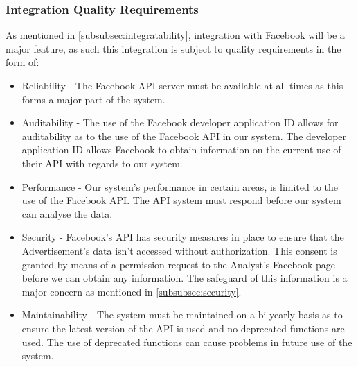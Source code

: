 \documentclass{article}
\begin{document}
		\subsubsection{Integration Quality Requirements}
		As mentioned in \ref{subsubsec:integratability}, integration with Facebook will be a major feature, as such this integration is subject to quality requirements in the form of:
		\begin{itemize}
			\item Reliability - The Facebook API server must be available at all times as this forms a major part of the system.
			\item Auditability - The use of the Facebook developer application ID allows for auditability as to the use of the Facebook API in our system. The developer application ID allows Facebook to obtain information on the current use of their API with regards to our system.
			\item Performance - Our system's performance in certain areas, is limited to the use of the Facebook API. The API system must respond before our system can analyse the data.
			\item Security - Facebook's API has security measures in place to ensure that the Advertisement's data isn't accessed without authorization. This consent is granted by means of a permission request to the Analyst's Facebook page before we can obtain any information. The safeguard of this information is a major concern as mentioned in \ref{subsubsec:security}.
			\item Maintainability - The system must be maintained on a bi-yearly basis as to ensure the latest version of the API is used and no deprecated functions are used. The use of deprecated functions can cause problems in future use of the system.
		\end{itemize}
\end{document}
